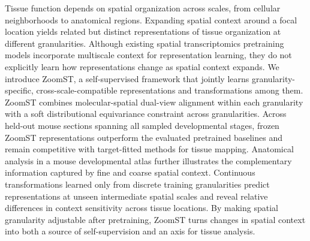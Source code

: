 Tissue function depends on spatial organization across scales, from cellular neighborhoods to anatomical regions. Expanding spatial context around a focal location yields related but distinct representations of tissue organization at different granularities. Although existing spatial transcriptomics pretraining models incorporate multiscale context for representation learning, they do not explicitly learn how representations change as spatial context expands. We introduce ZoomST, a self-supervised framework that jointly learns granularity-specific, cross-scale-compatible representations and transformations among them. ZoomST combines molecular-spatial dual-view alignment within each granularity with a soft distributional equivariance constraint across granularities. Across held-out mouse sections spanning all sampled developmental stages, frozen ZoomST representations outperform the evaluated pretrained baselines and remain competitive with target-fitted methods for tissue mapping. Anatomical analysis in a mouse developmental atlas further illustrates the complementary information captured by fine and coarse spatial context. Continuous transformations learned only from discrete training granularities predict representations at unseen intermediate spatial scales and reveal relative differences in context sensitivity across tissue locations. By making spatial granularity adjustable after pretraining, ZoomST turns changes in spatial context into both a source of self-supervision and an axis for tissue analysis.
